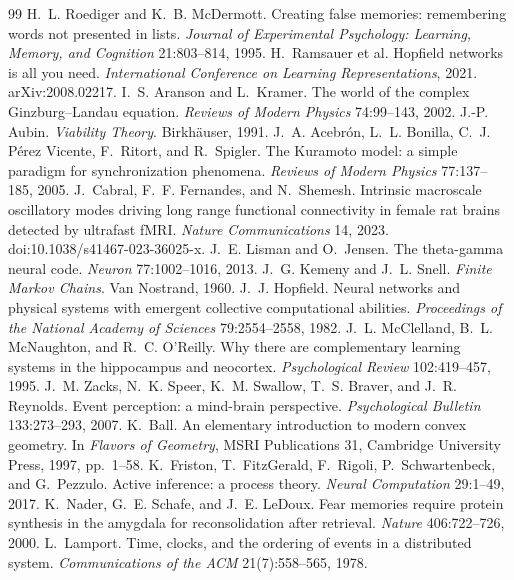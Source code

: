 \documentclass[11pt,twoside,openany]{book}
\theoremstyle{plain}
\theoremstyle{definition}
\theoremstyle{remark}
\theoremstyle{definition}
\begin{document}
\begin{thebibliography}{99}
 H.~L. Roediger and K.~B. McDermott. Creating false memories: remembering words not presented in lists. \emph{Journal of Experimental Psychology: Learning, Memory, and Cognition} 21:803--814, 1995.
 H.~Ramsauer et al. Hopfield networks is all you need. \emph{International Conference on Learning Representations}, 2021. arXiv:2008.02217.
 I.~S. Aranson and L.~Kramer. The world of the complex Ginzburg--Landau equation. \emph{Reviews of Modern Physics} 74:99--143, 2002.
 J.-P. Aubin. \emph{Viability Theory}. Birkh\"auser, 1991.
 J.~A. Acebr\'on, L.~L. Bonilla, C.~J. P\'erez Vicente, F.~Ritort, and R.~Spigler. The Kuramoto model: a simple paradigm for synchronization phenomena. \emph{Reviews of Modern Physics} 77:137--185, 2005.
 J.~Cabral, F.~F. Fernandes, and N.~Shemesh. Intrinsic macroscale oscillatory modes driving long range functional connectivity in female rat brains detected by ultrafast fMRI. \emph{Nature Communications} 14, 2023. doi:10.1038/s41467-023-36025-x.
 J.~E. Lisman and O.~Jensen. The theta-gamma neural code. \emph{Neuron} 77:1002--1016, 2013.
 J.~G. Kemeny and J.~L. Snell. \emph{Finite Markov Chains}. Van Nostrand, 1960.
 J.~J. Hopfield. Neural networks and physical systems with emergent collective computational abilities. \emph{Proceedings of the National Academy of Sciences} 79:2554--2558, 1982.
 J.~L. McClelland, B.~L. McNaughton, and R.~C. O'Reilly. Why there are complementary learning systems in the hippocampus and neocortex. \emph{Psychological Review} 102:419--457, 1995.
 J.~M. Zacks, N.~K. Speer, K.~M. Swallow, T.~S. Braver, and J.~R. Reynolds. Event perception: a mind-brain perspective. \emph{Psychological Bulletin} 133:273--293, 2007.
 K.~Ball. An elementary introduction to modern convex geometry. In \emph{Flavors of Geometry}, MSRI Publications 31, Cambridge University Press, 1997, pp.~1--58.
 K.~Friston, T.~FitzGerald, F.~Rigoli, P.~Schwartenbeck, and G.~Pezzulo. Active inference: a process theory. \emph{Neural Computation} 29:1--49, 2017.
 K.~Nader, G.~E. Schafe, and J.~E. LeDoux. Fear memories require protein synthesis in the amygdala for reconsolidation after retrieval. \emph{Nature} 406:722--726, 2000.
 L.~Lamport. Time, clocks, and the ordering of events in a distributed system. \emph{Communications of the ACM} 21(7):558--565, 1978.

\end{thebibliography}
\end{document}

